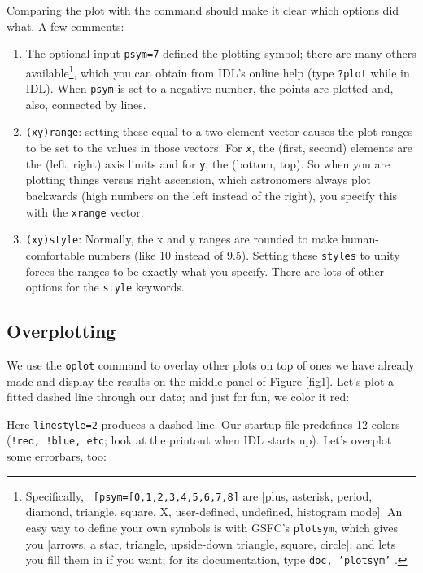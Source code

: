 \documentclass[psfig,preprint]{aastex}
\begin{document}
Comparing the plot with the command should make it clear which options
did what. A few comments: \begin{enumerate}

\item The optional input {\tt psym=7} defined the plotting symbol; there
  are many others available\footnote{Specifically, {\tt
      [psym=[0,1,2,3,4,5,6,7,8]} are [plus, asterisk, period, diamond,
        triangle, square, X, user-defined, undefined, histogram
        mode]. An easy way to define your own symbols is with GSFC's
      {\tt plotsym}, which gives you [arrows, a star, triangle,
        upside-down triangle, square, circle]; and lets you fill them in
      if you want; for its documentation, type {\tt doc, 'plotsym'} .},
    which you can obtain from IDL's online help (type {\tt ?plot} while
    in IDL).  When {\tt psym} is set to a negative number, the points
    are plotted and, also, connected by lines.

\item {\tt (xy)range}: setting these equal to a two element vector
  causes the plot ranges to be set to the values in those vectors.  For
  {\tt x}, the (first, second) elements are the (left, right) axis
  limits and for {\tt y}, the (bottom, top). So when you are plotting
  things versus right ascension, which astronomers always plot backwards
  (high numbers on the left instead of the right), you specify this with
  the {\tt xrange} vector.

\item {\tt (xy)style}: Normally, the x and y ranges are rounded to make
  human-comfortable numbers (like 10 instead of 9.5).  Setting these
  {\tt styles} to unity forces the ranges to be exactly what you
  specify. There are lots of other options for the {\tt style} keywords.
\end{enumerate}

\subsection{Overplotting} \label{oplot}

We use the {\tt oplot} command to overlay other plots on top of ones we
have already made and display the results on the middle panel of Figure
\ref{fig1}.  Let's plot a fitted dashed line through our data; and just
for fun, we color it red:


\noindent Here {\tt linestyle=2} produces a dashed line. Our startup
file predefines 12 colors ({\tt !red, !blue, etc}; look at the printout
when IDL starts up). Let's overplot some errorbars, too:
\end{document}
